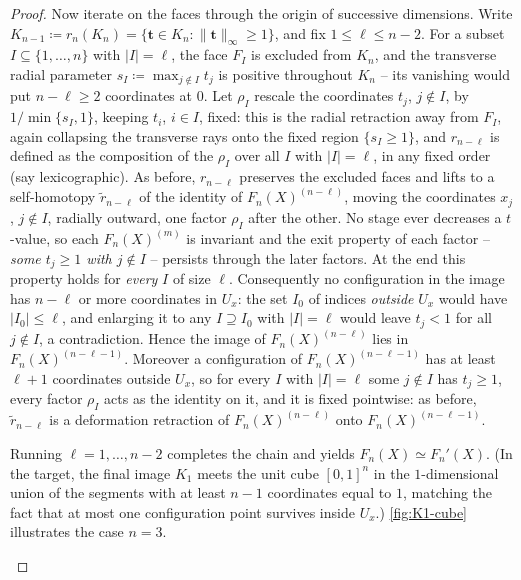 \documentclass[10pt,a4paper]{amsart}
\newcommand\bft{\mathbf{t}}
\renewcommand{\tilde}{\widetilde}
\begin{document}
\begin{proof}
Now iterate on the faces through the origin of successive
dimensions. Write
\(K_{n-1}\coloneqq r_n(K_n)=\{\bft\in K_n:\|\bft\|_\infty\ge1\}\),
and fix \(1\le \ell\le n-2\). For a subset
\(I\subseteq\{1,\dots,n\}\) with \(|I|=\ell\), the face \(F_I\)
is excluded from \(K_n\), and the transverse radial parameter
\(s_I\coloneqq\max_{j\notin I}t_j\) is positive throughout
\(K_n\) -- its vanishing would put \(n-\ell\ge2\) coordinates at
\(0\). Let \(\rho_I\) rescale the coordinates \(t_j\),
\(j\notin I\), by \(1/\min\{s_I,1\}\), keeping \(t_i\), \(i\in
I\), fixed: this is the radial retraction away from \(F_I\),
again collapsing the transverse rays onto the fixed region
\(\{s_I\ge1\}\), and \(r_{n-\ell}\) is defined
as the composition of the \(\rho_I\) over all \(I\) with
\(|I|=\ell\), in any fixed order (say lexicographic). As before,
\(r_{n-\ell}\) preserves the excluded faces and lifts to a
self-homotopy \(\tilde r_{n-\ell}\) of the identity of
\(F_n(X)^{(n-\ell)}\), moving the coordinates \(x_j\),
\(j\notin I\), radially outward, one factor \(\rho_I\) after the
other. No stage ever decreases a \(t\)-value, so each
\(F_n(X)^{(m)}\) is invariant and the exit property of each
factor -- \emph{some \(t_j\ge1\) with \(j\notin I\)} -- persists
through the later factors. At the end this property holds for
\emph{every} \(I\) of size \(\ell\). Consequently no
configuration in the image has \(n-\ell\) or more coordinates in
\(U_x\): the set \(I_0\) of indices \emph{outside} \(U_x\) would
have \(|I_0|\le\ell\), and enlarging it to any \(I\supseteq I_0\)
with \(|I|=\ell\) would leave \(t_j<1\) for all \(j\notin I\), a
contradiction. Hence the image of \(F_n(X)^{(n-\ell)}\) lies in
\(F_n(X)^{(n-\ell-1)}\). Moreover a configuration of
\(F_n(X)^{(n-\ell-1)}\) has at least \(\ell+1\) coordinates
outside \(U_x\), so for every \(I\) with \(|I|=\ell\) some
\(j\notin I\) has \(t_j\ge1\), every factor \(\rho_I\) acts as
the identity on it, and it is fixed pointwise: as before,
\(\tilde r_{n-\ell}\) is a deformation retraction of
\(F_n(X)^{(n-\ell)}\) onto \(F_n(X)^{(n-\ell-1)}\).

Running \(\ell=1,\dots,n-2\) completes the chain and yields
\(F_n(X)\simeq F_n'(X)\). (In the target, the final image
\(K_1\) meets the unit cube \([0,1]^n\) in the \(1\)-dimensional
union of the segments with at least \(n-1\) coordinates equal to
\(1\), matching the fact that at most one configuration point
survives inside \(U_x\).) \cref{fig:K1-cube} illustrates the
case \(n=3\).

\begin{figure}[ht]
\centering
\begin{tikzpicture}[line width=0.8pt, scale=0.9]


\end{tikzpicture}
\end{figure}
\end{proof}
\end{document}
